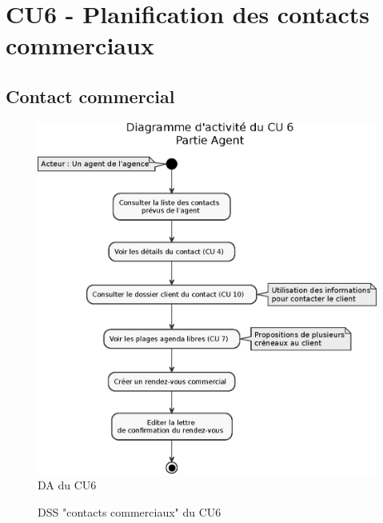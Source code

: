 \section{CU6 - Planification des contacts commerciaux}

\subsection{Contact commercial}
\begin{figure}[H]
\centering
\includegraphics[width=\textwidth]{figures/eps/DA_CU6_partieAgent.eps}
\caption{DA du CU6}
\end{figure}

\begin{figure}[H]
\noindent{}
\caption{DSS "contacts commerciaux" du CU6}
\end{figure}

